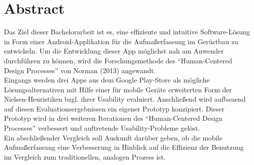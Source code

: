 \chapter*{\centering Abstract}
Das Ziel dieser Bachelorarbeit ist es, eine effiziente und intuitive Software-Lösung in Form einer Android-Applikation für die Aufmaßerfassung im Gerüstbau zu entwickeln. 
Um die Entwicklung dieser App möglichst nah am Anwender durchführen zu können, wird die Forschungsmethode des ``Human-Centered Design Processes'' von Norman (2013) angewandt. \\

Eingangs werden drei Apps aus dem Google Play-Store als mögliche Lösungsalternativen mit Hilfe einer für mobile Geräte erweiterten Form der Nielsen-Heuristiken bzgl. ihrer Usability evaluiert.
Anschließend wird aufbauend auf diesen Evaluationsergebnissen ein eigener Prototyp konzipiert.
Dieser Prototyp wird in drei weiteren Iterationen des ``Human-Centered Design Processes'' verbessert und auftretende Usability-Probleme gelöst.  \\

Ein abschließender Vergleich soll Auskunft darüber geben, ob die mobile Aufmaßerfassung eine Verbesserung in Hinblick auf die Effizienz der Benutzung im Vergleich zum traditionellen, analogen Prozess ist.
